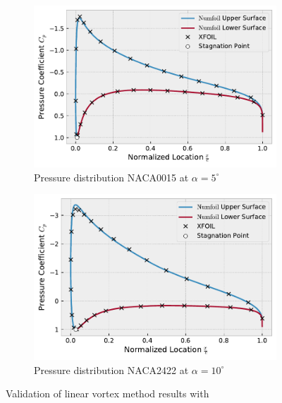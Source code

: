 \begin{figure}[h]
    \centering
    \begin{subfigure}{.5\textwidth}
      \centering
      \captionsetup{width=.8\linewidth}
      \includegraphics[width=.9\linewidth]{static/thick_verif_naca0015_alpha5.pdf}
      \caption{\centering Pressure distribution NACA0015 at $\alpha = 5^{\circ}$}
      \label{fig:thick_verif1}
    \end{subfigure}%
    \begin{subfigure}{.5\textwidth}
      \centering
      \captionsetup{width=.8\linewidth}
      \includegraphics[width=.9\linewidth]{static/thick_verif_naca2422_alpha10.pdf}
      \caption{\centering Pressure distribution NACA2422 at $\alpha = 10^{\circ}$}
      \label{fig:thick_verif2}
    \end{subfigure}
    \caption{\centering Validation of linear vortex method results with \xfoil\cite{xfoil}}
    \label{fig:thick_verif}
\end{figure}



